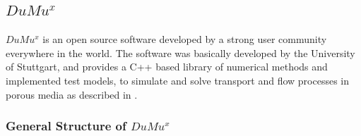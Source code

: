 \subsection{$DuMu^x$}

$DuMu^x$ is an open source software developed by a strong user community everywhere in the world. The software was basically developed by the University of Stuttgart, and provides a C++ based library of numerical methods and implemented test models, to simulate and solve transport and flow processes in porous media as described in \cite{flemisch2007dumux}.

\subsubsection{General Structure of $DuMu^x$}

